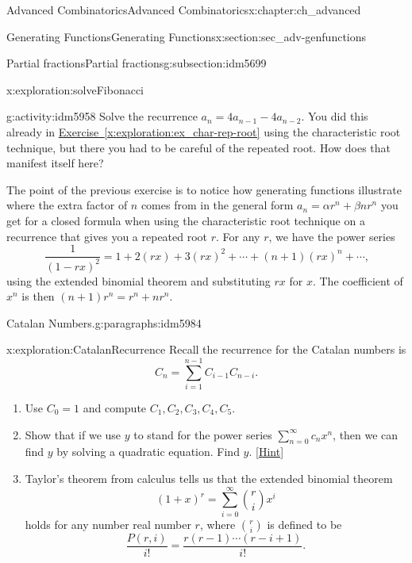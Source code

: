 \documentclass[oneside,10pt,]{book}
\numberwithin{equation}{chapter}
\begin{document}
\begin{chapterptx}{Advanced Combinatorics}{}{Advanced Combinatorics}{}{}{x:chapter:ch_advanced}
\begin{sectionptx}{Generating Functions}{}{Generating Functions}{}{}{x:section:sec_adv-genfunctions}
\begin{subsectionptx}{Partial fractions}{}{Partial fractions}{}{}{g:subsection:idm5699}
\begin{exploration}{}{x:exploration:solveFibonacci}
\begin{enumerate}[font=\bfseries,label=(\alph*),ref=\alph*]
\end{enumerate}
\end{exploration}
\begin{activity}{}{g:activity:idm5958}%
Solve the recurrence \(a_n= 4a_{n-1} - 4a_{n-2}\).  You did this already in \hyperref[x:exploration:ex_char-rep-root]{Exercise~\ref{x:exploration:ex_char-rep-root}} using the characteristic root technique, but there you had to be careful of the repeated root.  How does that manifest itself here?%
\end{activity}
The point of the previous exercise is to notice how generating functions illustrate where the extra factor of \(n\) comes from in the general form \(a_n = \alpha r^n + \beta n r^n\) you get for a closed formula when using the characteristic root technique on a recurrence that gives you a repeated root \(r\).  For any \(r\), we have the power series%
\begin{equation*}
\frac{1}{(1-rx)^2} = 1 + 2(rx) + 3(rx)^2 + \cdots + (n+1)(rx)^n + \cdots\text{,}
\end{equation*}
using the extended binomial theorem and substituting \(rx\) for \(x\).  The coefficient of \(x^n\) is then \((n+1)r^n = r^n + nr^n\).%
\begin{paragraphs}{Catalan Numbers.}{g:paragraphs:idm5984}%
\begin{exploration}{}{x:exploration:CatalanRecurrence}%
Recall the recurrence for the Catalan numbers is%
\begin{equation*}
C_n = \sum_{i=1}^{n-1} C_{i-1}C_{n-i}\text{.}
\end{equation*}
%
\begin{enumerate}[font=\bfseries,label=(\alph*),ref=\alph*]
\item{}Use \(C_0 = 1\) and compute \(C_1, C_2, C_3, C_4, C_5\).%
\item{}Show that if we use \(y\) to stand for the power series \(\sum_{n=0}^\infty c_nx^n\), then we can find \(y\) by solving a quadratic equation. Find \(y\).%
\space\hspace*{0pt}\hfill{\tiny\hyperlink{g:hint:idm6002-back}{[Hint]}}\item{}Taylor's theorem from calculus tells us that the extended binomial theorem%
\begin{equation*}
(1+x)^r = \sum_{i=0}^\infty \binom{r}{i}x^i
\end{equation*}
holds for any number real number \(r\), where \(\binom{r}{i}\) is defined to be%
\begin{equation*}
\frac{P(r,i)}{i!} = \frac{r(r-1)\cdots(r-i+1)}{i!}\text{.}

\end{equation*}
\end{enumerate}
\end{exploration}
\end{paragraphs}
\end{subsectionptx}
\end{sectionptx}
\end{chapterptx}
\end{document}
